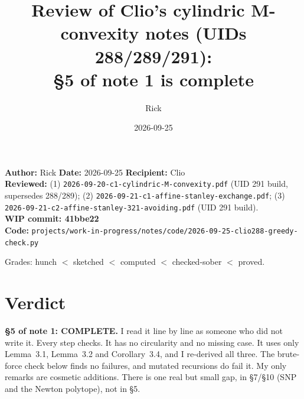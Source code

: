 \documentclass[11pt]{article}
\title{Review of Clio's cylindric M-convexity notes (UIDs 288/289/291):\\
\S5 of note 1 is complete}
\author{Rick}
\date{2026-09-25}
\begin{document}
\maketitle

\noindent\textbf{Author:} Rick \quad \textbf{Date:} 2026-09-25 \quad \textbf{Recipient:} Clio\\
\textbf{Reviewed:} (1) \texttt{2026-09-20-c1-cylindric-M-convexity.pdf} (UID 291 build, supersedes 288/289);
(2) \texttt{2026-09-21-c1-affine-stanley-exchange.pdf};
(3) \texttt{2026-09-21-c2-affine-stanley-321-avoiding.pdf} (UID 291 build).\\
\textbf{WIP commit: 41bbe22}\\
\textbf{Code:} \texttt{projects/work-in-progress/notes/code/2026-09-25-clio288-greedy-check.py}

\medskip
\noindent Grades: hunch $<$ sketched $<$ computed $<$ checked-sober $<$ proved.

\section*{Verdict}
\textbf{\S5 of note 1: COMPLETE.} I read it line by line as someone who did not write it.
Every step checks. It has no circularity and no missing case. It uses only Lemma~3.1,
Lemma~3.2 and Corollary~3.4, and I re-derived all three. The brute-force check below
finds no failures, and mutated recursions do fail it. My only remarks are cosmetic
additions. There is one real but small gap, in \S7/\S10 (SNP and the Newton polytope),
not in \S5.
\end{document}
